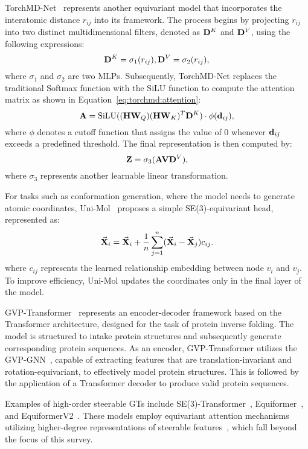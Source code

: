 TorchMD-Net~\cite{tholke2022torchmd} represents another equivariant model that incorporates the interatomic distance $r_{ij}$ into its framework. The process begins by projecting $r_{ij}$ into two distinct multidimensional filters, denoted as $\mathbf{D}^{K}$ and $\mathbf{D}^{V}$, using the following expressions:
\begin{equation}\label{torchmd}
    \mathbf{D}^{K} = \sigma_1(r_{ij}), \mathbf{D}^{V} = \sigma_2(r_{ij}),
\end{equation}
where $\sigma_1$ and $\sigma_2$ are two MLPs. Subsequently, 
TorchMD-Net replaces the traditional Softmax function with the SiLU function to compute the attention matrix as shown in Equation~\eqref{eq:torchmd:attention}:
\begin{equation}
    \label{eq:torchmd:attention}
    \mathbf{A} = \text{SiLU}((\mathbf{H}\mathbf{W}_{Q})(\mathbf{H}\mathbf{W}_{K})^T \mathbf{D}^{K}) \cdot \phi(\mathbf{d}_{ij}),
\end{equation}
where $\phi$ denotes a cutoff function that assigns the value of $0$ whenever $\mathbf{d}_{ij}$ exceeds a predefined threshold. The final representation is then computed by:
\begin{equation}
    \mathbf{Z} = \sigma_3(\mathbf{A} \mathbf{V} \mathbf{D}^{V}),
\end{equation}
where $\sigma_3$ represents another learnable linear transformation.

For tasks such as conformation generation, where the model needs to generate atomic coordinates, Uni-Mol~\cite{zhou2023unimol} proposes a simple SE(3)-equivariant head, represented as:
\begin{align}
    \vec{\mathbf{X}}_i = \vec{\mathbf{X}}_i + \frac{1}{n} \sum_{j=1}^{n} (\vec{\mathbf{X}}_i - \vec{\mathbf{X}}_j)c_{ij}.
\end{align}
where $c_{ij}$ represents the learned relationship embedding between node $v_i$ and $v_j$. 
To improve efficiency, Uni-Mol updates the coordinates only in the final layer of the model.

GVP-Transformer~\cite{hsu2022learning} represents an encoder-decoder framework based on the Transformer architecture, designed for the task of protein inverse folding. The model is structured to intake protein structures and subsequently generate corresponding protein sequences. As an encoder, GVP-Transformer utilizes the GVP-GNN~\cite{jing2021learning}, capable of extracting features that are translation-invariant and rotation-equivariant, to effectively model protein structures. This is followed by the application of a Transformer decoder to produce valid protein sequences.

Examples of high-order steerable GTs include SE(3)-Transformer~\cite{fuchs2020se3transformers}, Equiformer~\cite{liao2023equiformer}, and EquiformerV2~\cite{equiformer_v2}. These models employ equivariant attention mechanisms utilizing higher-degree representations of steerable features~\cite{han2024survey}, which fall beyond the focus of this survey.


